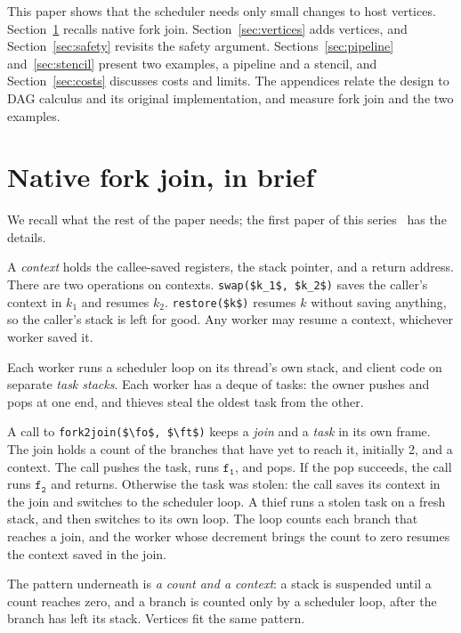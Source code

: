 \documentclass[sigplan,nonacm]{acmart}
\newcommand{\fo}{\mathtt{f_1}}
\newcommand{\ft}{\mathtt{f_2}}
\begin{document}
This paper shows that the scheduler needs only small changes to host
vertices.
%
Section~\ref{sec:nfj} recalls native fork join.
%
Section~\ref{sec:vertices} adds vertices, and
Section~\ref{sec:safety} revisits the safety argument.
%
Sections~\ref{sec:pipeline} and~\ref{sec:stencil} present two
examples, a pipeline and a stencil, and Section~\ref{sec:costs}
discusses costs and limits.
%
The appendices relate the design to DAG calculus and its original
implementation, and measure fork join and the two examples.

\section{Native fork join, in brief}
\label{sec:nfj}

We recall what the rest of the paper needs; the first paper of this
series~\cite{nativeforkjoin} has the details.

A \emph{context} holds the callee-saved registers, the stack pointer,
and a return address.
%
There are two operations on contexts.
%
\lstinline|swap($k_1$, $k_2$)| saves the caller's context in $k_1$ and
resumes $k_2$.
%
\lstinline|restore($k$)| resumes $k$ without saving anything, so the
caller's stack is left for good.
%
Any worker may resume a context, whichever worker saved it.

Each worker runs a scheduler loop on its thread's own stack, and client
code on separate \emph{task stacks}.
%
Each worker has a deque of tasks: the owner pushes and pops at one end,
and thieves steal the oldest task from the other.

A call to \lstinline|fork2join($\fo$, $\ft$)| keeps a \emph{join} and a
\emph{task} in its own frame.
%
The join holds a count of the branches that have yet to reach it,
initially 2, and a context.
%
The call pushes the task, runs $\fo$, and pops.
%
If the pop succeeds, the call runs $\ft$ and returns.
%
Otherwise the task was stolen: the call saves its context in the join
and switches to the scheduler loop.
%
A thief runs a stolen task on a fresh stack, and then switches to its
own loop.
%
The loop counts each branch that reaches a join, and the worker whose
decrement brings the count to zero resumes the context saved in the
join.

The pattern underneath is \emph{a count and a context}: a stack is
suspended until a count reaches zero, and a branch is counted only by a
scheduler loop, after the branch has left its stack.
%
Vertices fit the same pattern.
\end{document}
